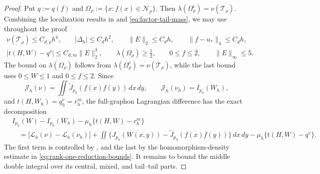 \begin{proof}
Put $q:=q(f)$ and
$\Omega_\rho:=\{x:f(x)\in\mathcal N_\rho\}$.  Then
$\lambda(\Omega_\rho^c)=\nu(\mathcal T_\rho)$.
Combining the localization results in 
and \eqref{eq:factor-tail-mass}, we may use throughout the proof
\begin{equation}\label{eq:graphon-comparison-estimates}
  \begin{gathered}
    \nu(\mathcal T_\rho)\le C_{d,\rho}h^4,
    \qquad |\Delta_h|\le C_dh^2,
    \qquad \|E\|_2\le C_dh,
    \qquad \|f-u_*\|_4\le C_dh,\\
    |t(H,W)-q^v|\le C_{d,m}\|E\|_2^3,
    \qquad \lambda(\Omega_\rho)\ge\frac12,
    \qquad 0\le f\le2,
    \qquad \|E\|_\infty\le5.
  \end{gathered}
\end{equation}
The bound on $\lambda(\Omega_\rho)$ follows from
$\lambda(\Omega_\rho^c)=\nu(\mathcal T_\rho)$, while the last bound uses
$0\le W\le1$ and $0\le f\le2$.
Since
\[
  \mathcal J_h(\nu)
  =\iint\widetilde J_{p_h}(f(x)f(y))\,dx\,dy,
  \qquad
  \mathcal J_h(\nu_h)=I_{p_h}(W_h),
\]
and $t(H,W_h)=q_h^v=r_h^m$, the full-graphon Lagrangian difference has the
exact decomposition
\begin{equation*}
\begin{aligned}
  &I_{p_h}(W)-I_{p_h}(W_h)-\mu_h\{t(H,W)-r_h^m\}\\
  &\quad=\bigl[\mathcal L_h(\nu)-\mathcal L_h(\nu_h)\bigr]
  +\iint\{J_{p_h}(W(x,y))-\widetilde J_{p_h}(f(x)f(y))\}\,dx\,dy
  -\mu_h\{t(H,W)-q^v\}.
\end{aligned}
\end{equation*}
The first term is controlled by , and
the last by the homomorphism-density estimate in
\eqref{eq:rank-one-reduction-bounds}.  It remains to bound the middle
double integral over its central, mixed, and tail--tail parts.


\end{proof}
